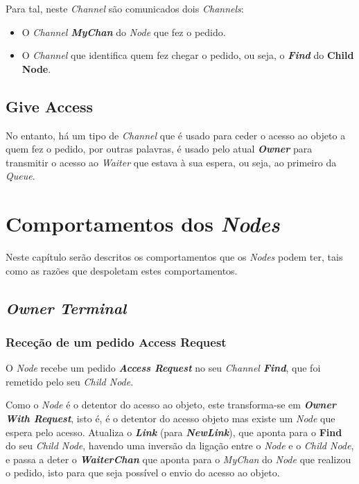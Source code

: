 Para tal, neste \emph{Channel} são comunicados dois \emph{Channels}:
\begin{itemize} \item O \emph{Channel \textbf{MyChan}} do \emph{Node} que fez o pedido.
    \item O \emph{Channel} que identifica quem fez chegar o pedido, ou seja, o \emph{\textbf{Find}} do \textbf{Child Node}.
\end{itemize}


\subsection*{Give Access}
No entanto, há um tipo de \emph{Channel} que é usado para ceder o acesso ao objeto a quem fez o pedido, por outras palavras, é usado pelo atual \emph{\textbf{Owner}} para transmitir o acesso ao \emph{Waiter} que estava à sua espera, ou seja, ao primeiro da \emph{Queue}.



\section{Comportamentos dos \emph{Nodes}}

Neste capítulo serão descritos os comportamentos que os \emph{Nodes} podem ter, tais como as razões que despoletam estes comportamentos.

\subsection*{\emph{Owner Terminal}}
\label{especificacao:nodes:owner_terminal}


\subsubsection*{Receção de um pedido Access Request}
O \emph{Node} recebe um pedido \emph{\textbf{Access Request}} no seu \emph{Channel \textbf{Find}},
que foi remetido pelo seu \emph{Child Node}. 


Como o \emph{Node} é o detentor do acesso ao objeto, este transforma-se em \emph{\textbf{Owner With Request}},
isto é, é o detentor do acesso objeto mas existe um \emph{Node} que espera pelo acesso.
Atualiza o \textbf{\emph{Link}} (para \textbf{\emph{NewLink}}),
que aponta para o \textbf{Find} do seu \emph{Child Node}, havendo uma inversão da ligação entre o \emph{Node} e o \emph{Child Node},
e passa a deter o \textbf{\emph{WaiterChan}} que aponta para o \emph{MyChan} do \emph{Node} que realizou o pedido, isto para
que seja possível o envio do acesso ao objeto.


